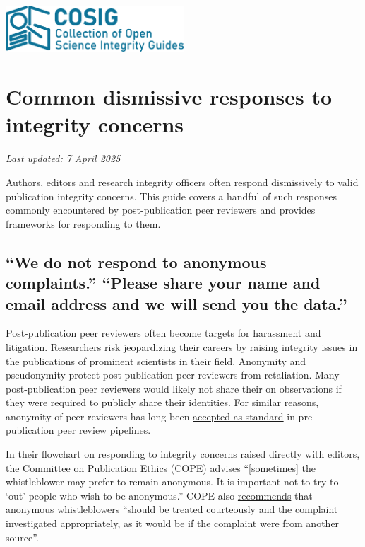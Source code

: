\documentclass[letterpaper, 12pt]{article}
\begin{document}
\flushleft
\includegraphics[width=0.5\textwidth]{img/home/241017_final_logo_mockup.png}

\section*{Common dismissive responses to integrity concerns}
\textit{Last updated: 7 April 2025}

Authors, editors and research integrity officers often respond dismissively to valid publication integrity concerns. This guide covers a handful of such responses commonly encountered by post-publication peer reviewers and provides frameworks for responding to them.

\subsection*{``We do not respond to anonymous complaints.''\newline 
``Please share your name and email address and we will send you the data.''}

Post-publication peer reviewers often become targets for harassment and litigation. Researchers risk jeopardizing their careers by raising integrity issues in the publications of prominent scientists in their field. Anonymity and pseudonymity protect post-publication peer reviewers from retaliation. Many post-publication peer reviewers would likely not share their on observations if they were required to publicly share their identities. For similar reasons, anonymity of peer reviewers has long been \href{https://doi.org/10.1038/6295}{accepted as standard} in pre-publication peer review pipelines. 

In their \href{https://doi.org/10.24318/cope.2019.2.25}{flowchart on responding to integrity concerns raised directly with editors}, the Committee on Publication Ethics (COPE) advises ``[sometimes] the whistleblower may prefer
to remain anonymous. It is important not to try to `out' people who wish to be anonymous.'' COPE also \href{https://doi.org/10.24318/Z9gtPzCa}{recommends} that anonymous whistleblowers ``should be treated courteously and the complaint investigated appropriately, as it would be if the complaint were from another source''.
\end{document}
